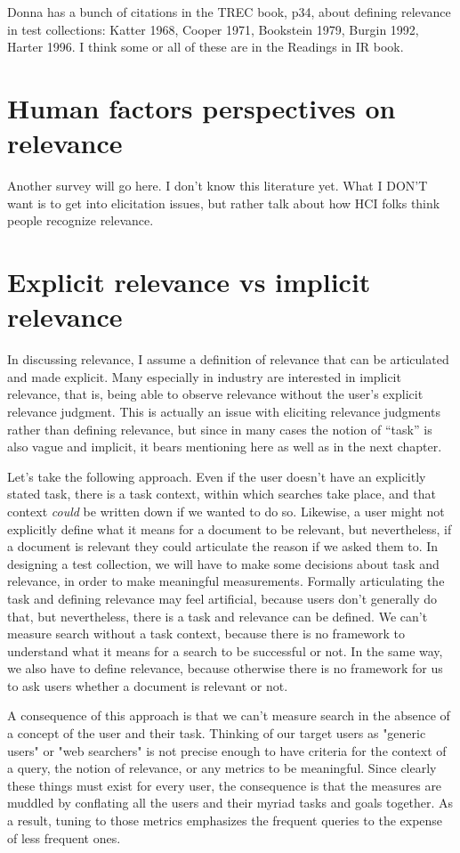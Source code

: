 \documentclass[nobib]{tufte-book}
\begin{document}
Donna has a bunch of citations in the TREC book, p34, about defining relevance in test collections: Katter 1968, Cooper 1971, Bookstein 1979, Burgin 1992, Harter 1996.  I think some or all of these are in the Readings in IR book.

\section{Human factors perspectives on relevance}

Another survey will go here.  I don't know this literature yet.  What I DON'T want is to get into elicitation issues, but rather talk about how HCI folks think people recognize relevance.

\section{Explicit relevance vs implicit relevance}

In discussing relevance, I assume a definition of relevance that can be articulated and made explicit.  Many especially in industry are interested in implicit relevance, that is, being able to observe relevance without the user's explicit relevance judgment.  This is actually an issue with eliciting relevance judgments rather than defining relevance, but since in many cases the notion of ``task'' is also vague and implicit, it bears mentioning here as well as in the next chapter.

Let's take the following approach.  Even if the user doesn't have an explicitly stated task, there is a task context, within which searches take place, and that context {\em could} be written down if we wanted to do so.  Likewise, a user might not explicitly define what it means for a document to be relevant, but nevertheless, if a document is relevant they could articulate the reason if we asked them to.  In designing a test collection, we will have to make some decisions about task and relevance, in order to make meaningful measurements.  Formally articulating the task and defining relevance may feel artificial, because users don't generally do that, but nevertheless, there is a task and relevance can be defined.  We can't measure search without a task context, because there is no framework to understand what it means for a search to be successful or not.  In the same way, we also have to define relevance, because otherwise there is no framework for us to ask users whether a document is relevant or not.

A consequence of this approach is that we can't measure search in the absence of a concept of the user and their task.  Thinking of our target users as "generic users" or "web searchers" is not precise enough to have criteria for the context of a query, the notion of relevance, or any metrics to be meaningful.  Since clearly these things must exist for every user, the consequence is that the measures are muddled by conflating all the users and their myriad tasks and goals together.  As a result, tuning to those metrics emphasizes the frequent queries to the expense of less frequent ones.
\end{document}
